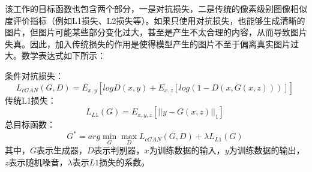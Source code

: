 该工作的目标函数也包含两个部分，一是对抗损失，二是传统的像素级别图像相似度评价指标（例如L1损失、L2损失等）。如果只使用对抗损失，也能够生成清晰的图片，但图片可能某些部分变化过大，甚至是产生不太合理的内容，从而导致图片失真。因此，加入传统损失的作用是使得模型产生的图片不至于偏离真实图片过大。数学表达式如下所示：

条件对抗损失：
\begin{equation}
L_{cGAN}(G,D)=E_{x,y}[logD(x,y)+E_{x,z}[log(1-D(x,G(x,z)))]]~
\end{equation}
传统L1损失：
\begin{equation}
L_{L1}(G)=E_{x,y,z}[||y-G(x,z)||_1] ~
\end{equation}
总目标函数：
\begin{equation}
G^*=arg \mathop{min}\limits_G \mathop{max}\limits_D L_{cGAN}(G,D)+\lambda L_{L1}(G) ~
\end{equation}
其中，$G$表示生成器，$D$表示判别器，$x$为训练数据的输入，$y$为训练数据的输出，$z$表示随机噪音，$\lambda$表示$L1$损失的系数。

